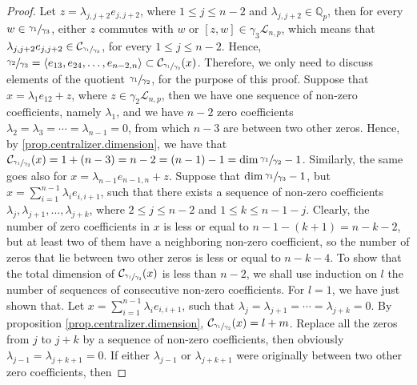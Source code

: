 \documentclass[12pt]{article}
\begin{document}
\begin{proof}
Let $z=\lambda_{j,j+2}e_{j,j+2}$, where $1\leq j\leq n-2$ and $\lambda_{j,j+2}\in\mathbb{Q}_p$, then for every $w\in\sfrac{\gamma_1}{\gamma_3}$, either $z$ commutes with $w$ or $[z,w]\in\gamma_3\mathcal{L}_{n,p}$, which means that $\lambda_{j,j+2}e_{j,j+2}\in\mathcal{C}_{\sfrac{\gamma_1}{\gamma_3}}$, for every $1\leq j\leq n-2$. Hence, $\sfrac{\gamma_2}{\gamma_3}=\langle e_{13},e_{24},\dots,e_{n-2,n}\rangle\subset\mathcal{C}_{\sfrac{\gamma_1}{\gamma_3}}(x)$. Therefore, we only need to discuss elements of the quotient $\sfrac{\gamma_1}{\gamma_2}$, for the purpose of this proof.
Suppose that $x=\lambda_1 e_{12}+z$, where $z\in\gamma_2 \mathcal{L}_{n,p}$, then we have one sequence of non-zero coefficients, namely $\lambda_1$, and we have $n-2$ zero coefficients $\lambda_2=\lambda_3=\cdots=\lambda_{n-1}=0$, from which $n-3$ are between two other zeros. Hence, by \ref{prop.centralizer.dimension}, we have that $\mathcal{C}_{\sfrac{\gamma_1}{\gamma_2}}(x)=1+(n-3)=n-2=(n-1)-1=\dim\sfrac{\gamma_1}{\gamma_2}-1$. Similarly, the same goes also for $x=\lambda_{n-1}e_{n-1,n}+z$.
Suppose that $\dim\sfrac{\gamma_1}{\gamma_3}-1$, but $x=\sum_{i=1}^{n-1}\lambda_i e_{i,i+1}$, such that there exists a sequence of non-zero coefficients $\lambda_j,\lambda_{j+1},\dots,\lambda_{j+k}$, where $2\leq j\leq n-2$ and $1\leq k\leq n-1-j$. Clearly, the number of zero coefficients in $x$ is less or equal to $n-1-(k+1)=n-k-2$, but at least two of them have a neighboring non-zero coefficient, so the number of zeros that lie between two other zeros is less or equal to $n-k-4$. To show that the total dimension of $\mathcal{C}_{\sfrac{\gamma_1}{\gamma_2}}(x)$ is less than $n-2$, we shall use induction on $l$ the number of sequences of consecutive non-zero coefficients. For $l=1$, we have just shown that. Let $x=\sum_{i=1}^{n-1}\lambda_i e_{i,i+1}$, such that $\lambda_j=\lambda_{j+1}=\cdots=\lambda_{j+k}=0$. By proposition \ref{prop.centralizer.dimension}, $\mathcal{C}_{\sfrac{\gamma_1}{\gamma_2}}(x)=l+m$. Replace all the zeros from $j$ to $j+k$ by a sequence of non-zero coefficients, then obviously $\lambda_{j-1}=\lambda_{j+k+1}=0$. If either $\lambda_{j-1}$ or $\lambda_{j+k+1}$ were originally between two other zero coefficients, then  
\end{proof}
\end{document}
